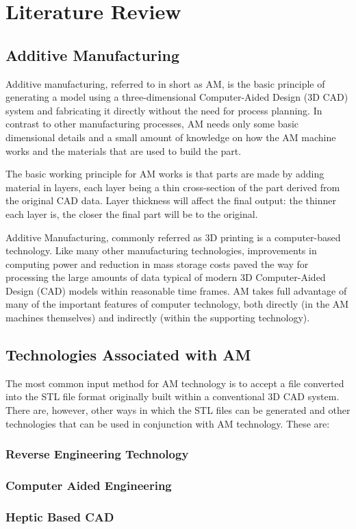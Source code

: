 \chapter{Literature Review}
\label{sec:review}
%
\section{Additive Manufacturing}
Additive manufacturing, referred to in short as AM, is the basic principle of generating a model using a three-dimensional Computer-Aided Design (3D CAD)
system and fabricating it directly without the need for process planning. In contrast to other manufacturing processes, AM needs only some basic dimensional details and a small amount of knowledge on how the AM machine works and the materials that are used to build the part.

The basic working principle for AM works is that parts are made by adding material in layers, each layer being a thin cross-section of the part derived from the original CAD data. Layer thickness will affect the final output: the thinner each layer is, the closer the final part will be to the original.

Additive Manufacturing, commonly referred as 3D printing is a computer-based technology. Like many  other manufacturing
technologies, improvements in computing power and reduction in mass storage
costs paved the way for processing the large amounts of data typical of modern 3D
Computer-Aided Design (CAD) models within reasonable time frames. AM takes full advantage of many of the important features of computer technology,
both directly (in the AM machines themselves) and indirectly (within the supporting technology). 

\section{Technologies Associated with AM}
The most common input method for AM technology is to accept a file converted
into the STL file format originally built within a conventional 3D CAD system.
There are, however, other ways in which the STL files can be generated and other
technologies that can be used in conjunction with AM technology. These are:

\subsection{Reverse Engineering Technology}

\subsection{Computer Aided Engineering}

\subsection{Heptic Based CAD}